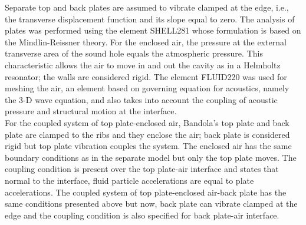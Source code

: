 Separate top and back plates are assumed to vibrate clamped at the edge, i.e., the transverse displacement function and its slope equal to zero. The analysis of plates was performed using the element SHELL281 whose formulation is based on the Mindlin-Reissner theory. For the enclosed air, the pressure at the external transverse area of the sound hole equals the atmospheric pressure. This characteristic allows the air to move in and out the cavity as in a Helmholtz resonator; the walls are considered rigid. The element FLUID220 was used for meshing the air, an element based on governing equation for acoustics, namely the 3-D wave equation, and also takes into account the coupling of acoustic pressure and structural motion at the interface.\\

For the coupled system of top plate-enclosed air, Bandola's top plate and back plate are clamped to the ribs and they enclose the air; back plate is considered rigid but top plate vibration couples the system. The enclosed air has the same boundary conditions as in the separate model but only the top plate moves. The coupling condition is present over the top plate-air interface and states that normal to the interface, fluid particle accelerations are equal to plate accelerations. The coupled system of top plate-enclosed air-back plate has the same conditions presented above but now, back plate can vibrate clamped at the edge and the coupling condition is also specified for back plate-air interface.



